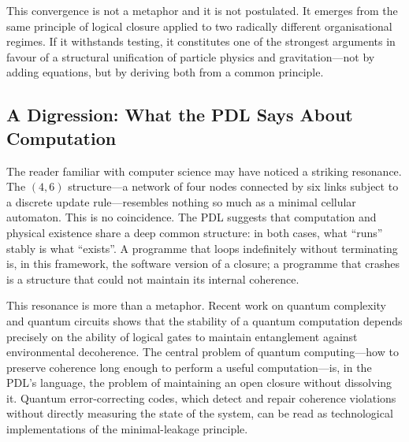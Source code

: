 \documentclass[12pt, a4paper, openright]{book}
\begin{document}
\medskip

This convergence is not a metaphor and it is not postulated. It emerges from the same principle of logical closure applied to two radically different organisational regimes. If it withstands testing, it constitutes one of the strongest arguments in favour of a structural unification of particle physics and gravitation---not by adding equations, but by deriving both from a common principle.

\subsection*{A Digression: What the PDL Says About Computation}

The reader familiar with computer science may have noticed a striking resonance. The $(4,6)$ structure---a network of four nodes connected by six links subject to a discrete update rule---resembles nothing so much as a minimal cellular automaton. This is no coincidence. The PDL suggests that computation and physical existence share a deep common structure: in both cases, what ``runs'' stably is what ``exists''. A programme that loops indefinitely without terminating is, in this framework, the software version of a closure; a programme that crashes is a structure that could not maintain its internal coherence.

\medskip

This resonance is more than a metaphor. Recent work on quantum complexity and quantum circuits shows that the stability of a quantum computation depends precisely on the ability of logical gates to maintain entanglement against environmental decoherence. The central problem of quantum computing---how to preserve coherence long enough to perform a useful computation---is, in the PDL's language, the problem of maintaining an open closure without dissolving it. Quantum error-correcting codes, which detect and repair coherence violations without directly measuring the state of the system, can be read as technological implementations of the minimal-leakage principle.

\medskip
\end{document}
